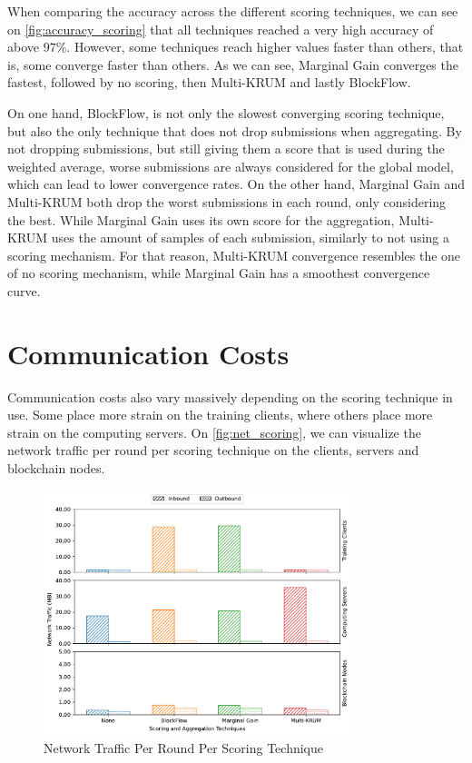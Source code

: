 When comparing the accuracy across the different scoring techniques, we can see on \autoref{fig:accuracy_scoring} that all techniques reached a very high accuracy of above $97\%$. However, some techniques reach higher values faster than others, that is, some converge faster than others. As we can see, Marginal Gain converges the fastest, followed by no scoring, then Multi-KRUM and lastly BlockFlow.

On one hand, BlockFlow, is not only the slowest converging scoring technique, but also the only technique that does not drop submissions when aggregating. By not dropping submissions, but still giving them a score that is used during the weighted average, worse submissions are always considered for the global model, which can lead to lower convergence rates. 
On the other hand, Marginal Gain and Multi-KRUM both drop the worst submissions in each round, only considering the best. While Marginal Gain uses its own score for the aggregation, Multi-KRUM uses the amount of samples of each submission, similarly to not using a scoring mechanism. For that reason, Multi-KRUM convergence resembles the one of no scoring mechanism, while Marginal Gain has a smoothest convergence curve.

\section{Communication Costs}

Communication costs also vary massively depending on the scoring technique in use. Some place more strain on the training clients, where others place more strain on the computing servers. On \autoref{fig:net_scoring}, we can visualize the network traffic per round per scoring technique on the clients, servers and blockchain nodes.

\begin{figure}[!ht]
    \centering
    \centering
    \includegraphics[width=0.8\textwidth]{graphics/scoring/net.pdf}
    \caption{Network Traffic Per Round Per Scoring Technique}
    \label{fig:net_scoring}
\end{figure}

